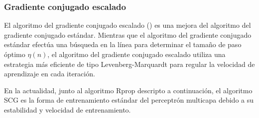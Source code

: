 %
\subsubsection{Gradiente conjugado escalado}
%
El algoritmo del gradiente conjugado escalado () \cite{scg} es una mejora del algoritmo del gradiente
conjugado estándar. Mientras que el algoritmo del gradiente conjugado
estándar efectúa una búsqueda en la línea para determinar el tamaño de
paso óptimo $\eta(n)$, el algoritmo del gradiente conjugado escalado
utiliza una estrategia más eficiente de tipo Levenberg-Marquardt para
regular la velocidad de aprendizaje en cada iteración.

En la actualidad, junto al algoritmo Rprop descripto a continuación,
el algoritmo SCG es la forma de entrenamiento estándar del perceptrón
multicapa debido a su estabilidad y velocidad de entrenamiento.



